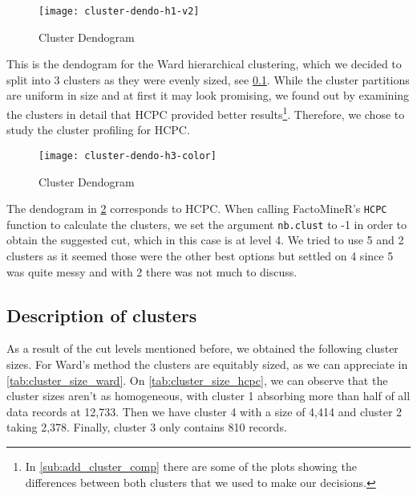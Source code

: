 
\begin{figure}[H]
    \centering
    \texttt{[image: cluster-dendo-h1-v2]}
    \caption{Cluster Dendogram}%
    \label{fig:dendogram-h2}
\end{figure}

This is the dendogram for the Ward hierarchical clustering, which we decided to
split into 3 clusters as they were evenly sized, see
\cref{sub:description_of_clusters}. While the cluster partitions are uniform in
size and at first it may look promising, we found out by examining the clusters
in detail that HCPC provided better results\footnote{
In \cref{sub:add_cluster_comp}
there are some of the plots showing the differences between both clusters that
we used to make our decisions.
}.
Therefore, we chose to study the
cluster profiling for HCPC.

\begin{landscape}
\begin{figure}[H]
    \centering
    \texttt{[image: cluster-dendo-h3-color]}
    \caption{Cluster Dendogram}%
    \label{fig:dendogram-final}
\end{figure}
\end{landscape}

The dendogram in \cref{fig:dendogram-final} corresponds to HCPC. When calling
FactoMineR's \texttt{HCPC} function to calculate the clusters, we set the
argument \texttt{nb.clust} to -1 in order to obtain the suggested cut, which in
this case is at level 4. We tried to use 5 and 2 clusters as it seemed those
were the other best options but settled on 4 since 5 was quite messy and with 2
there was not much to discuss.


\subsection{Description of clusters}%
\label{sub:description_of_clusters}

As a result of the cut levels mentioned before, we obtained the following cluster sizes.
For Ward's method the clusters are equitably sized, as we can appreciate in
\cref{tab:cluster_size_ward}. On \cref{tab:cluster_size_hcpc}, we can observe that
the cluster sizes aren't as homogeneous, with cluster 1 absorbing more than half
of all data records at 12,733. Then we have cluster 4 with a size of 4,414 and cluster 2
taking 2,378. Finally, cluster 3 only contains 810 records.

